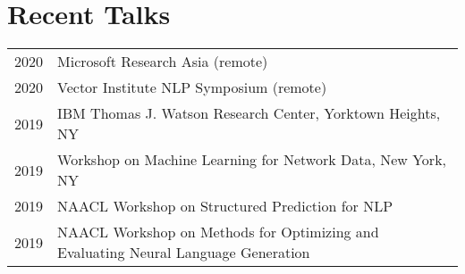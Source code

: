 \documentclass[a4paper,11pt]{article}
\begin{document}

\section{Recent Talks}
\begin{longtable}{rl}
    2020 & Microsoft Research Asia (remote) \\
    2020 & Vector Institute NLP Symposium (remote) \\
    2019 & IBM Thomas J. Watson Research Center, Yorktown Heights, NY \\
    2019 & Workshop on Machine Learning for Network Data, New York, NY \\
    2019 & NAACL Workshop on Structured Prediction for NLP \\
    2019 & NAACL Workshop on Methods for Optimizing and Evaluating Neural Language Generation \\
\end{longtable}
\end{document}

